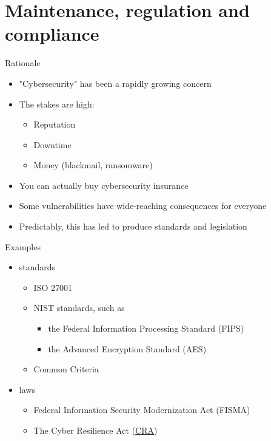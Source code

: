 \section{Maintenance, regulation and compliance}

\begin{frame}{Rationale}
  \begin{itemize}
    \item "Cybersecurity" has been a rapidly growing concern
    \item The stakes are high:
    \begin{itemize}
      \item Reputation
      \item Downtime
      \item Money (blackmail, ransomware)
    \end{itemize}
    \item You can actually buy cybersecurity insurance
    \item Some vulnerabilities have wide-reaching consequences for everyone
    \item Predictably, this has led to produce standards and legislation
  \end{itemize}
\end{frame}

\begin{frame}{Examples}
  \begin{itemize}
    \item standards
    \begin{itemize}
      \item ISO 27001
      \item NIST standards, such as
      \begin{itemize}
        \item the Federal Information Processing Standard (FIPS)
        \item the Advanced Encryption Standard (AES)
      \end{itemize}
      \item Common Criteria
    \end{itemize}
    \item laws
    \begin{itemize}
      \item Federal Information Security Modernization Act (FISMA)
      \item The Cyber Resilience Act (\href{https://eur-lex.europa.eu/legal-content/EN/TXT/?uri=CELEX\%3A02024R2847-20241120}{CRA})
    \end{itemize}
  \end{itemize}
\end{frame}

